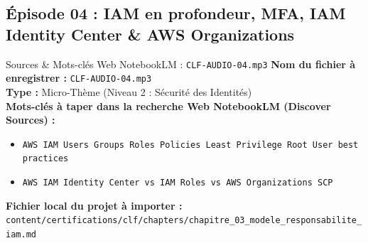 \documentclass[11pt,a4paper]{article}
\begin{document}
\subsection{Épisode 04 : IAM en profondeur, MFA, IAM Identity Center \& AWS Organizations}
\begin{sourcebox}{Sources \& Mots-clés Web NotebookLM : \texttt{CLF-AUDIO-04.mp3}}
\textbf{Nom du fichier à enregistrer :} \texttt{CLF-AUDIO-04.mp3}\\
\textbf{Type :} Micro-Thème (Niveau 2 : Sécurité des Identités)\\
\textbf{Mots-clés à taper dans la recherche Web NotebookLM (Discover Sources) :}
\begin{itemize}[noitemsep]
    \item \texttt{AWS IAM Users Groups Roles Policies Least Privilege Root User best practices}
    \item \texttt{AWS IAM Identity Center vs IAM Roles vs AWS Organizations SCP}
\end{itemize}
\textbf{Fichier local du projet à importer :}
\texttt{content/certifications/clf/chapters/chapitre_03_modele_responsabilite_iam.md}
\end{sourcebox}
\end{document}
